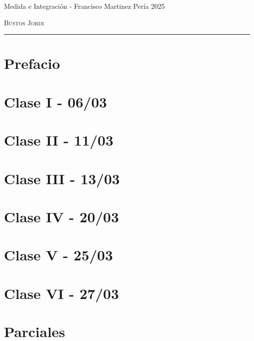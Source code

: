 \documentclass[12pt,a4paper]{book}
\begin{document}
\renewcommand{\contentsname}{\vspace{0cm} Contenido \vspace{-2cm}}

\begin{titlepage}
    \vspace*{2cm}

    \noindent
    \vspace*{0.5cm}

    \vspace{1.5cm}
    \epigraph{Medida e Integración - Francisco Martinez Pería 2025}%
    {\textsc{Bustos Jordi}}
    \null\vfill
    \vspace*{1cm}
    \noindent
    \hfill
    \begin{minipage}{0.7\linewidth}
        \begin{flushright}
            \printauthor
        \end{flushright}
    \end{minipage}
    \begin{minipage}{0.02\linewidth}
        \rule{1pt}{70pt}
    \end{minipage}
    \titlepagedecoration
\end{titlepage}

\let\cleardoublepage=\clearpage
\tableofcontents
\blankpage

\chapter*{Prefacio}


\chapter{Clase I - 06/03 }


\chapter{Clase II - 11/03 }


\chapter{Clase III - 13/03 }


\chapter{Clase IV - 20/03 }


\chapter{Clase V - 25/03 }


\chapter{Clase VI - 27/03 }


\chapter{Parciales}


\blankpage



\nocite{*}
\end{document}
